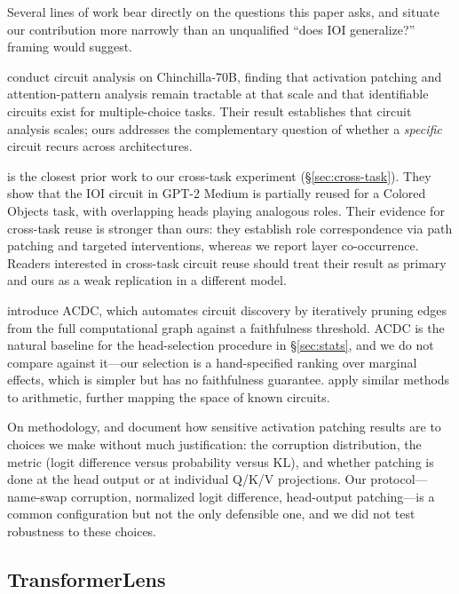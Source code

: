 \documentclass[11pt,a4paper]{article}
\begin{document}
Several lines of work bear directly on the questions this paper asks, and situate our
contribution more narrowly than an unqualified ``does IOI generalize?'' framing would
suggest.

\citet{lieberum2023scale} conduct circuit analysis on Chinchilla-70B, finding that
activation patching and attention-pattern analysis remain tractable at that scale and
that identifiable circuits exist for multiple-choice tasks. Their result establishes
that circuit analysis scales; ours addresses the complementary question of whether a
\emph{specific} circuit recurs across architectures.

\citet{merullo2024reuse} is the closest prior work to our cross-task experiment
(\S\ref{sec:cross-task}). They show that the IOI circuit in GPT-2 Medium is partially
reused for a Colored Objects task, with overlapping heads playing analogous roles.
Their evidence for cross-task reuse is stronger than ours: they establish role
correspondence via path patching and targeted interventions, whereas we report layer
co-occurrence. Readers interested in cross-task circuit reuse should treat their
result as primary and ours as a weak replication in a different model.

\citet{conmy2023acdc} introduce ACDC, which automates circuit discovery by iteratively
pruning edges from the full computational graph against a faithfulness threshold. ACDC
is the natural baseline for the head-selection procedure in \S\ref{sec:stats}, and we
do not compare against it---our selection is a hand-specified ranking over marginal
effects, which is simpler but has no faithfulness guarantee. \citet{hanna2023greaterthan}
apply similar methods to arithmetic, further mapping the space of known circuits.

On methodology, \citet{zhang2024bestpractices} and \citet{heimersheim2024patching}
document how sensitive activation patching results are to choices we make without much
justification: the corruption distribution, the metric (logit difference versus
probability versus KL), and whether patching is done at the head output or at
individual Q/K/V projections. Our protocol---name-swap corruption, normalized logit
difference, head-output patching---is a common configuration but not the only defensible
one, and we did not test robustness to these choices.

\subsection{TransformerLens}
\end{document}
